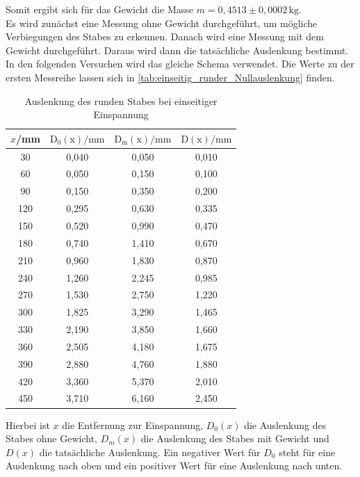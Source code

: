   Somit ergibt sich für das Gewicht die Masse $m = 0{,}4513 \pm 0,0002 \, \mathrm{kg}$.\\

  Es wird zunächst eine Messung ohne Gewicht durchgeführt, um mögliche Verbiegungen des Stabes zu erkennen. Danach wird eine Messung mit
  dem Gewicht durchgeführt. Daraus wird dann die tatsächliche Auslenkung bestimmt. In den folgenden Versuchen wird das gleiche Schema verwendet. Die Werte zu der ersten
  Messreihe lassen sich in \autoref{tab:einseitig_runder_Nullauslenkung} finden.

  \begin{table}
    \centering
    \caption{Auslenkung des runden Stabes bei einseitiger Einspannung}
    \label{tab:einseitig_runder_Nullauslenkung}
    \begin{tabular}{c c c c}
      \toprule
      $x$/mm & $\mathrm{D_0(x)}/\mathrm{mm}$ & $\mathrm{D_m(x)}/\mathrm{mm}$ & $\mathrm{D(x)}/\mathrm{mm}$ \\
      \midrule
      30 & 0,040 & 0,050 & 0,010 \\
      60 & 0,050 & 0,150 & 0,100 \\
      90 & 0,150 & 0,350 & 0,200 \\
      120 & 0,295 & 0,630 & 0,335 \\
      150 & 0,520 & 0,990 & 0,470 \\
      180 & 0,740 & 1,410 & 0,670 \\
      210 & 0,960 & 1,830 & 0,870 \\
      240 & 1,260 & 2,245 & 0,985 \\
      270 & 1,530 & 2,750 & 1,220 \\
      300 & 1,825 & 3,290 & 1,465 \\
      330 & 2,190 & 3,850 & 1,660 \\
      360 & 2,505 & 4,180 & 1,675 \\
      390 & 2,880 & 4,760 & 1,880 \\
      420 & 3,360 & 5,370 & 2,010 \\
      450 & 3,710 & 6,160 & 2,450 \\
      \bottomrule
    \end{tabular}
  \end{table}

  Hierbei ist $x$ die Entfernung zur Einspannung, $D_0(x)$ die Auslenkung des Stabes ohne Gewicht, $D_m(x)$ die Auslenkung des Stabes mit Gewicht und
  $D(x)$ die tatsächliche Auslenkung. Ein negativer Wert für $D_0$ steht für eine Auslenkung nach oben und ein positiver Wert für eine Auslenkung nach unten.\\


